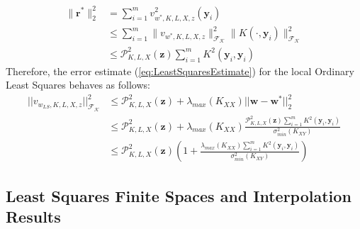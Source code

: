 \documentclass[11pt]{article}
\begin{document}
\begin{align*}
\| \bm{r}^* \|_2^2 &= \sum_{i=1}^m v_{w^*,K,L,X,z}^2(\bm{y}_i)\\
&\le \sum_{i=1}^m \| v_{w^*,K,L,X,z} \|^2_\mathcal{F_K} \| K(\cdot,\bm{y}_i) \|^2_\mathcal{F_K} \\
&\le \mathcal{P}_{K,L,X}^2(\bm{z}) \sum_{i=1}^m K^2(\bm{y}_i, \bm{y}_i)
\end{align*}
Therefore, the error estimate (\ref{eq:LeastSquaresEstimate}) for the local Ordinary Least Squares behaves as follows:
\begin{align}
||v_{w_{LS},K,L,X,z}||_\mathcal{F_K}^2 &\le \mathcal{P}_{K,L,X}^2(\bm{z}) +  \lambda_{max}(K_{XX}) || \bm{w} - \bm{w}^* ||_2^2 \nonumber \\
&\le \mathcal{P}_{K,L,X}^2(\bm{z}) + \lambda_{max}(K_{XX}) \frac{\mathcal{P}_{K,L,X}^2(\bm{z}) \sum_{i=1}^m K^2(\bm{y}_i, \bm{y}_i)}{\sigma_{min}^2(K_{XY})} \nonumber \\
&\le \mathcal{P}_{K,L,X}^2(\bm{z}) \left(1 + \frac{\lambda_{max}(K_{XX})\sum_{i=1}^m K^2(\bm{y}_i, \bm{y}_i)}{\sigma_{min}^2(K_{XY})} \right)
\label{eq:LeastSquaresEstimate}
\end{align}

\subsection{Least Squares Finite Spaces and Interpolation Results}
\end{document}
